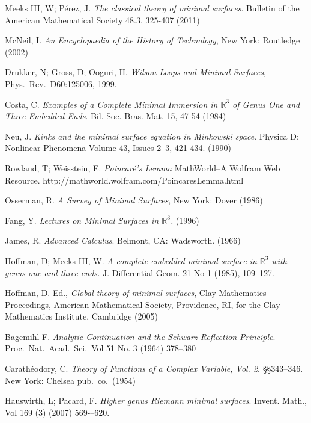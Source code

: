 \documentclass[a4paper,11pt]{article}
\numberwithin{equation}{section}
\theoremstyle{definition}
\newcommand{\R}{\mathbb{R}}
\begin{document}
\newpage
\begin{thebibliography}{99}

    Meeks III, W; P\'erez, J. \textit{The classical theory of minimal surfaces}. Bulletin of the American Mathematical Society 48.3, 325-407 (2011)
        
    McNeil, I. \textit{An Encyclopaedia of the History of Technology},
    New York: Routledge (2002)
    
    Drukker, N; Gross, D; Ooguri, H. \textit{Wilson Loops and Minimal
      Surfaces},   Phys.\ Rev.\ D60:125006, 1999.
    
    Costa, C. \textit{Examples of a Complete Minimal Immersion in $\R^3$ of Genus One and Three Embedded Ends}. Bil. Soc. Bras. Mat. 15, 47-54 (1984)
    
    Neu, J. \textit{Kinks and the minimal surface equation in Minkowski space}. Physica D: Nonlinear Phenomena
Volume 43, Issues 2–3, 421-434. (1990)
    
    Rowland, T; Weisstein, E. \textit{Poincar\'e's Lemma} MathWorld--A Wolfram Web Resource. http://mathworld.wolfram.com/PoincaresLemma.html
    
    Osserman, R. \textit{A Survey of Minimal Surfaces}, New York:
    Dover (1986)
    
    Fang, Y. \textit{Lectures on Minimal Surfaces in $\R^3$.} (1996)
    
    James, R. \textit{Advanced Calculus}. Belmont, CA: Wadsworth. (1966)
    
    Hoffman, D; Meeks III, W. \textit{A complete embedded minimal
      surface in $\R^3$ with genus one and three ends.}
    J. Differential Geom. 21 No 1 (1985), 109--127.
    
    Hoffman, D. Ed., \textit{Global theory of minimal surfaces}, Clay
    Mathematics Proceedings, American Mathematical Society, Providence, RI, for the Clay Mathematics Institute, Cambridge (2005)
    
    Bagemihl F. \textit{Analytic Continuation and the Schwarz
      Reflection Principle}. Proc.\  Nat.\ Acad.\ Sci.\ Vol 51 No. 3 (1964) 378--380
    
    Carath\'eodory, C. \textit{Theory of Functions of a Complex
      Variable, Vol. 2}. \S\S 343--346. New York: Chelsea pub.\ co.\ (1954)
    
    Hauswirth, L; Pacard, F. \textit{Higher genus Riemann minimal
      surfaces}. Invent. Math., Vol 169 (3) (2007) 569-–620.
\end{thebibliography}
\end{document}
